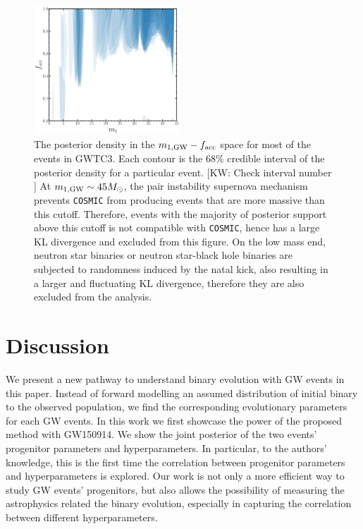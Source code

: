 \documentclass[twocolumn]{aastex631}
\newcommand{\kw}[1]{{\color{rb4}[KW: #1 ]}}
\begin{document}
\begin{figure}
\includegraphics[width=0.49\textwidth]{static/GWTC3_f_acc_mass.pdf}
\caption{
    The posterior density in the $m_{1,{\rm GW}}-f_{\rm acc}$ space for most of the events in GWTC3.
    Each contour is the $68\%$ credible interval of the posterior density for a particular event. \kw{Check interval number}
    At $m_{1,{\rm GW}} \sim 45 M_{\odot}$, the pair instability supernova mechanism prevents \texttt{COSMIC} from producing events that are more massive than this cutoff.
    Therefore, events with the majority of posterior support above this cutoff is not compatible with \texttt{COSMIC}, hence has a large KL divergence and excluded from this figure.
    On the low mass end, neutron star binaries or neutron star-black hole binaries are subjected to randomness induced by the natal kick,
    also resulting in a larger and fluctuating KL divergence, therefore they are also excluded from the analysis.
}
\label{fig:GWTC3_f_acc_mass}
\end{figure}

\section{Discussion}
\label{sec:discussion}


We present a new pathway to understand binary evolution with GW events in this paper.
Instead of forward modelling an assumed distribution of initial binary to the observed population,
we find the corresponding evolutionary parameters for each GW events. 
In this work we first showcase the power of the proposed method with GW150914.
We show the joint posterior of the two events' progenitor parameters and hyperparameters.
In particular, to the authors' knowledge, this is the first time the correlation between progenitor parameters and hyperparameters is explored.
Our work is not only a more efficient way to study GW events' progenitors,
but also allows the possibility of measuring the astrophysics related the binary evolution, especially in capturing the correlation between different hyperparameters.
\end{document}
